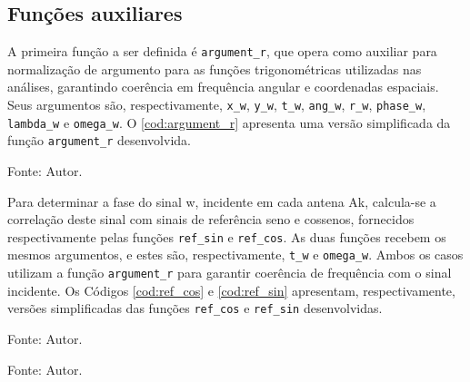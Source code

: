 \subsection{Funções auxiliares}

A primeira função a ser definida é \lstinline|argument_r|, que opera como auxiliar para normalização de argumento para as funções trigonométricas utilizadas nas análises, garantindo coerência em frequência angular e coordenadas espaciais.
Seus argumentos são, respectivamente, \lstinline|x_w|, \lstinline|y_w|, \lstinline|t_w|, \lstinline|ang_w|, \lstinline|r_w|, \lstinline|phase_w|, \lstinline|lambda_w| e \lstinline|omega_w|.
O \autoref{cod:argument_r} apresenta uma versão simplificada da função \lstinline|argument_r| desenvolvida.

\begin{lstfloat}[htbp]
	\centering
	
	\caption*{Fonte: Autor.}
\end{lstfloat}


Para determinar a fase do sinal \ac{w}, incidente em cada antena \ac{Ak}, calcula-se a correlação deste sinal com sinais de referência seno e cossenos, fornecidos respectivamente pelas funções \lstinline|ref_sin| e \lstinline|ref_cos|.
As duas funções recebem os mesmos argumentos, e estes são, respectivamente, \lstinline|t_w| e \lstinline|omega_w|.
Ambos os casos utilizam a função \lstinline|argument_r| para garantir coerência de frequência com o sinal incidente.
Os Códigos \ref{cod:ref_cos} e \ref{cod:ref_sin} apresentam, respectivamente, versões simplificadas das funções \lstinline|ref_cos| e \lstinline|ref_sin| desenvolvidas.


\begin{lstfloat}[htbp]
	\centering
	
	\caption*{Fonte: Autor.}
\end{lstfloat}

\begin{lstfloat}[htbp]
	\centering
	
	\caption*{Fonte: Autor.}
\end{lstfloat}


